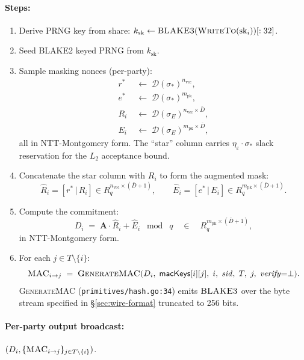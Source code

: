 \paragraph{Steps:}
\begin{enumerate}[leftmargin=2em, nosep]
\item Derive PRNG key from share:
      $k_{\mathrm{sk}} \leftarrow \textsc{BLAKE3}(\textsc{WriteTo}(
      \mathrm{sk}_i))[:32]$.
\item Seed BLAKE2 keyed PRNG from $k_{\mathrm{sk}}$.
\item Sample masking nonces (per-party):
      \begin{align*}
        r^* \;&\leftarrow\; \mathcal{D}(\sigma_*)^{n_{\mathrm{vec}}}, \\
        e^* \;&\leftarrow\; \mathcal{D}(\sigma_*)^{m_{\mathrm{pk}}}, \\
        R_i \;&\leftarrow\; \mathcal{D}(\sigma_E)^{n_{\mathrm{vec}}
                            \times \bar D}, \\
        E_i \;&\leftarrow\; \mathcal{D}(\sigma_E)^{m_{\mathrm{pk}}
                            \times \bar D},
      \end{align*}
      all in NTT-Montgomery form. The ``star'' column carries
      $\eta_\varepsilon \cdot \sigma_*$ slack reservation for the
      $L_2$ acceptance bound.
\item Concatenate the star column with $R_i$ to form the augmented
      mask:
      \[
        \hat R_i = [r^* \,|\, R_i] \in R_q^{n_{\mathrm{vec}} \times
        (\bar D + 1)}, \qquad
        \hat E_i = [e^* \,|\, E_i] \in R_q^{m_{\mathrm{pk}} \times
        (\bar D + 1)}.
      \]
\item Compute the commitment:
      \[
        D_i \;=\; \mathbf{A} \cdot \hat R_i + \hat E_i
        \;\bmod\; q
        \quad \in \quad R_q^{m_{\mathrm{pk}} \times (\bar D + 1)},
      \]
      in NTT-Montgomery form.
\item For each $j \in T \setminus \{i\}$:
      \[
        \textsc{MAC}_{i \to j}
        \;=\; \textsc{GenerateMAC}(D_i,\; \mathsf{macKeys}[i][j],\;
        i,\; \mathit{sid},\; T,\; j,\; \mathit{verify} {=} \bot).
      \]
      \textsc{GenerateMAC} (\texttt{primitives/hash.go:34}) emits
      $\textsc{BLAKE3}$ over the byte stream specified in
      \S\ref{sec:wire-format} truncated to 256 bits.
\end{enumerate}

\paragraph{Per-party output broadcast:} $(D_i,
\{\textsc{MAC}_{i \to j}\}_{j \in T \setminus \{i\}})$.

